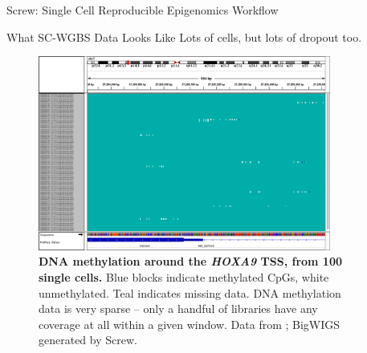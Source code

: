 \documentclass{beamer}
\begin{document}
\begin{frame}
\begin{columns}[t]
\begin{column}{.32\textwidth}
\begin{block}{Screw: Single Cell Reproducible Epigenomics Workflow}
\end{block}


\begin{block}{What SC-WGBS Data Looks Like}
Lots of cells, but lots of dropout too.

\begin{figure}
\begin{center}
\includegraphics[width=0.9\textwidth]{figures/hoxa9_meth.png}

\end{center}
\caption{\textbf{DNA methylation around the \textit{HOXA9} TSS, from 100 single cells.}  Blue blocks indicate methylated CpGs, white unmethylated. Teal indicates missing data. DNA methylation data is very sparse -- only a handful of libraries have any coverage at all within a given window. Data from \cite{Farlik2016}; BigWIGS generated by Screw.}
\end{figure}
\end{block}




\end{column}


\begin{column}{.65\textwidth}
\vspace*{-\baselineskip}
  \begin{columns}[t,totalwidth=\textwidth]
    \begin{column}{.48\textwidth}
    
	
	\end{column}


\end{columns}
\end{column}
\end{columns}
\end{frame}
\end{document}
